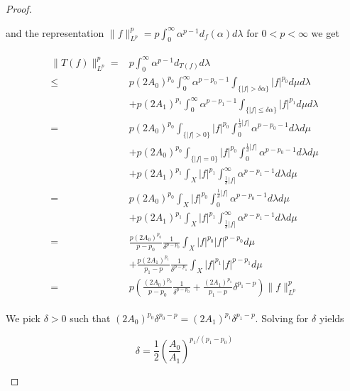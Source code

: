 \begin{proof}
\begin{enumerate}[label = \textbf{(\roman*.)}]
\begin{enumerate}[label = \textbf{\alph*.}]
		and the representation $\displaystyle \|f\|^p_{L^p} = p \int_0^{\infty} \alpha^{p-1}d_f(\alpha) d\lambda$ for $ 0 < p < \infty$ we get

		\begin{gather}
			\begin{aligned}
				\|T(f)\|^p_{L^p} = & p\int_0^{\infty}\alpha^{p-1}d_{T(f)} d\lambda\\
				\leqslant & p(2A_0)^{p_0}\int_0^{\infty}\alpha^{p-p_0-1} \int_{\{\vert f \vert > \delta \alpha\}} \vert f\vert^{p_0}d\mu d\lambda\\
				& + p(2A_1)^{p_1}\int_0^{\infty}\alpha^{p-p_1-1} \int_{\{\vert f \vert \leqslant \delta \alpha\}} \vert f \vert^{p_1}d\mu d\lambda\\
				= & p(2A_0)^{p_0}\int_{\{\vert f \vert > 0\}} \vert f \vert^{p_0} \int_0^{\frac{1}{\delta}\vert f\vert}\alpha^{p-p_0-1} d\lambda d\mu\\
				& + p(2A_0)^{p_0}\int_{\{\vert f \vert = 0\}} \vert f \vert^{p_0} \int_0^{\frac{1}{\delta}\vert f\vert}\alpha^{p-p_0-1} d\lambda d\mu\\
				& + p(2A_1)^{p_1}\int_X \vert f\vert^{p_1} \int_{\frac{1}{\delta}\vert f\vert}^{\infty}\alpha^{p - p_1 - 1} d\lambda d\mu\\
				= & p(2A_0)^{p_0}\int_X \vert f \vert^{p_0} \int_0^{\frac{1}{\delta}\vert f\vert}\alpha^{p-p_0-1} d\lambda d\mu\\
				& + p(2A_1)^{p_1}\int_X \vert f\vert^{p_1} \int_{\frac{1}{\delta}\vert f\vert}^{\infty}\alpha^{p - p_1 - 1} d\lambda d\mu\\
				= & \frac{p(2A_0)^{p_0}}{p-p_0}\frac{1}{\delta^{p-p_0}}\int_X \vert f \vert^{p_0}\vert f \vert^{p-p_0} d\mu\\
				& + \frac{p(2A_1)^{p_1}}{p_1-p}\frac{1}{\delta^{p-p_1}}\int_X \vert f \vert^{p_1} \vert f\vert^{p-p_1}d\mu\\
				= & p\left( \frac{(2A_0)^{p_0}}{p - p_0}\frac{1}{\delta^{p - p_0}} + \frac{(2A_1)^{p_1}}{p_1 - p}\delta^{p_1 - p} \right)\|f\|_{L^p}^p
			\end{aligned}
			\label{est:Tfp}
		\end{gather}

		We pick $\delta > 0$ such that $(2A_0)^{p_0}\delta^{p_0 - p} = (2A_1)^{p_1}\delta^{p_1 - p}$. Solving for $\delta$ yields 

		\begin{equation}
			\delta = \frac{1}{2} \left( \frac{A_0}{A_1}\right)^{p_1/(p_1 - p_0)}
		\end{equation}


\end{enumerate}
\end{enumerate}
\end{proof}
